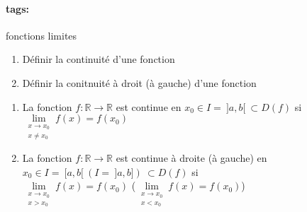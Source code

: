 \documentclass[12pt]{article}
\newcommand*{\xfield}[1]{\begin{mdframed}\centering #1\end{mdframed}\bigskip}
\newenvironment{note}{}{}
\newcommand*{\tags}[1]{\paragraph{tags: }#1}
\begin{document}
\begin{note}
	\tags{fonctions limites}
	\xfield{\begin{enumerate}
		\item Définir la continuité d'une fonction
		\item Définir la conitnuité à droit (à gauche) d'une fonction
	\end{enumerate} }
	\xfield{\begin{enumerate}
		\item La fonction $f:\mathbb{R}\to \mathbb{R}$ est continue en $x_0 \in I =\ ]a,b[\ \subset D(f)$ si $\lim\limits_{\substack{x\to x_0\\x \neq x_0}}f(x) = f(x_0)$
		\item La fonction $f:\mathbb{R}\to \mathbb{R}$ est continue à droite (à gauche) en $x_0 \in I =\ [a,b[\ (I =\ ]a,b])\ \subset D(f)$ si\\
		 $\lim\limits_{\substack{x\to x_0\\x > x_0}}f(x) = f(x_0)$ ($\lim\limits_{\substack{x\to x_0\\x < x_0}}f(x) = f(x_0)$)
	\end{enumerate} }
\end{note}
\end{document}
